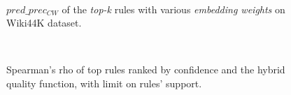 \begin{figure}[t]
     \\   
     \caption{$pred\_prec_{CW}$ of the \textit{top-k} rules with various \textit{embedding weights} on Wiki44K dataset.}
     \label{fig:appendix_exp1_wiki44k}
\end{figure} 

\begin{figure}[t]
     \centering
     \\
     \caption{Spearman's rho of top rules ranked by confidence and the hybrid quality function, with limit on rules' support.}
     \label{fig:low_sp}
\end{figure}
